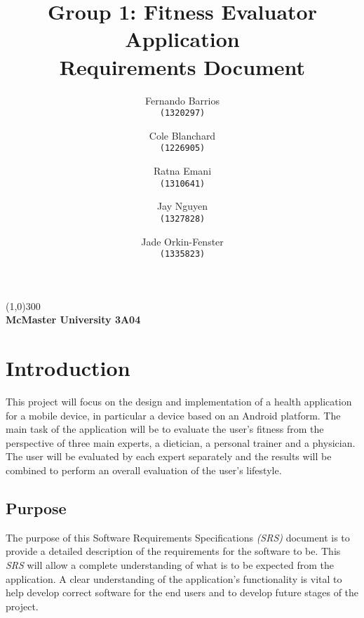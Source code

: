 \documentclass[12pt,letterpaper]{article}
\begin{document}
	\begin{titlepage}
		
		\title{Group 1: Fitness Evaluator Application\\ Requirements Document}
		\author{Fernando Barrios\\
		\texttt{(1320297)}
		\and
		Cole Blanchard\\
		\texttt{(1226905)}
		\and
		Ratna Emani\\
		\texttt{(1310641)}
		\and
		Jay Nguyen\\
		\texttt{(1327828)}
		\and
		Jade Orkin-Fenster\\
		\texttt{(1335823)}
		}
		\maketitle
		
		\center
		\line(1,0){300}\\
		\large\bfseries{McMaster University 3A04}
		
		
	\end{titlepage}
	
	\tableofcontents
	
	\clearpage
		
	


\section{Introduction}
This project will focus on the design and implementation of a health application for a mobile device, in particular a device based on an Android platform. The main task of the application will be to evaluate the user's fitness from the perspective of three main experts, a dietician, a personal trainer and a physician. The user will be evaluated by each expert separately and the results will be combined to perform an overall evaluation of the user's lifestyle.

\subsection{Purpose}
The purpose of this Software Requirements Specifications \textit{(SRS)} document is to provide a detailed description of the requirements for the software to be. This \textit{SRS} will allow a complete understanding of what is to be expected from the application. A clear understanding of the application's functionality is vital to help develop correct software for the end users and to develop future stages of the project. 
\end{document}
